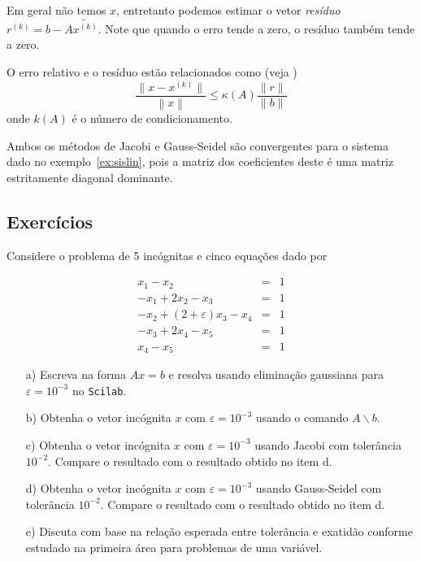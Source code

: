 Em geral não temos $x$, entretanto podemos estimar o vetor \emph{resíduo} $r^{(k)}=b-A\tilde{x^{(k)}}$. Note que quando o erro tende a zero, o resíduo também tende a zero. 

\begin{teo}
 O erro relativo e o resíduo estão relacionados como (veja \cite{Burden2013})
\begin{equation*}
  \frac{ \|x-x^{(k)}\|}{\left\|x\right\|} \leq  \kappa(A) \frac{\|r\|}{\|b\|}
\end{equation*}
onde $k(A)$ é o número de condicionamento.
\end{teo}

\begin{ex}
  Ambos os métodos de Jacobi e Gauss-Seidel são convergentes para o sistema dado no exemplo~\ref{ex:sislin}, pois a matriz dos coeficientes deste é uma matriz estritamente diagonal dominante.
\end{ex}

\subsection*{Exercícios}

\begin{exer} Considere o problema de 5 incógnitas e cinco equações dado por

\begin{eqnarray*}
x_1-x_2&=&1\\
-x_{1}+2x_2-x_{3}&=&1\\
-x_{2}+(2+\varepsilon) x_3-x_{4}&=&1\\
-x_{3}+2x_4-x_{5}&=&1\\
x_{4}-x_{5}&=&1
\end{eqnarray*}
\begin{itemize}
\item[a)]  Escreva na forma $Ax=b$ e resolva usando eliminação gaussiana para $\varepsilon=10^{-3}$ no \verb+Scilab+.
\item[b)]  Obtenha o vetor incógnita $x$ com $\varepsilon=10^{-3}$ usando o comando $A\backslash b$.
\item[c)]  Obtenha o vetor incógnita $x$ com $\varepsilon=10^{-3}$ usando Jacobi com tolerância $10^{-2}$. Compare o resultado com o resultado obtido no item d.
\item[d)]  Obtenha o vetor incógnita $x$ com $\varepsilon=10^{-3}$ usando Gauss-Seidel com tolerância $10^{-2}$. Compare o resultado com o resultado obtido no item d.
\item[e)]  Discuta com base na relação esperada entre tolerância e exatidão conforme estudado na primeira área para problemas de uma variável.
\end{itemize}

\end{exer}

